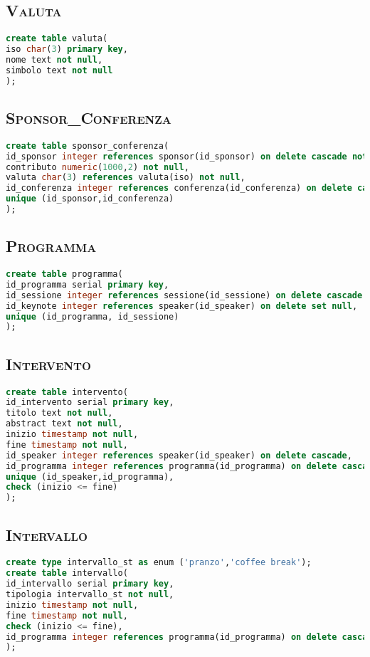 \subsection{\textsc{Valuta}}
\begin{lstlisting}[language=SQL,style=mystyle]
create table valuta(
iso char(3) primary key,
nome text not null,
simbolo text not null
);
\end{lstlisting}
\subsection{\textsc{Sponsor\_Conferenza}}
\begin{lstlisting}[language=SQL,style=mystyle]
create table sponsor_conferenza(
id_sponsor integer references sponsor(id_sponsor) on delete cascade not null,
contributo numeric(1000,2) not null,
valuta char(3) references valuta(iso) not null,
id_conferenza integer references conferenza(id_conferenza) on delete cascade not null,
unique (id_sponsor,id_conferenza) 
);
\end{lstlisting}
\subsection{\textsc{Programma}}
\begin{lstlisting}[language=SQL,style=mystyle]
create table programma(
id_programma serial primary key,
id_sessione integer references sessione(id_sessione) on delete cascade not null,
id_keynote integer references speaker(id_speaker) on delete set null,
unique (id_programma, id_sessione)
);

\end{lstlisting}
\subsection{\textsc{Intervento}}
\begin{lstlisting}[language=SQL,style=mystyle]
create table intervento(
id_intervento serial primary key,
titolo text not null,
abstract text not null,
inizio timestamp not null,
fine timestamp not null,
id_speaker integer references speaker(id_speaker) on delete cascade,
id_programma integer references programma(id_programma) on delete cascade not null,
unique (id_speaker,id_programma), 
check (inizio <= fine) 
);
\end{lstlisting}
\subsection{\textsc{Intervallo}}
\begin{lstlisting}[language=SQL,style=mystyle]
create type intervallo_st as enum ('pranzo','coffee break');
create table intervallo(
id_intervallo serial primary key,
tipologia intervallo_st not null,
inizio timestamp not null,
fine timestamp not null,
check (inizio <= fine), 
id_programma integer references programma(id_programma) on delete cascade not null
);
\end{lstlisting}
